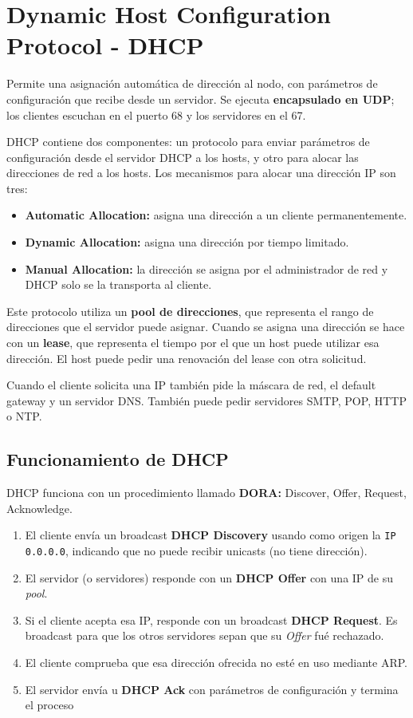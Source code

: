 \section{Dynamic Host Configuration Protocol - DHCP}

Permite una asignación automática de dirección al nodo, con parámetros de configuración que recibe desde un servidor. Se ejecuta \textbf{encapsulado en UDP}; los clientes escuchan en el puerto 68 y los servidores en el 67.

DHCP contiene dos componentes: un protocolo para enviar parámetros de configuración desde el servidor DHCP a los hosts, y otro para alocar las direcciones de red a los hosts. Los mecanismos para alocar una dirección IP son tres: 

\begin{itemize}[label=\textcolor{acento}{$\bullet$}]
    \item \textbf{Automatic Allocation:} asigna una dirección a un cliente permanentemente.
    \item \textbf{Dynamic Allocation:} asigna una dirección por tiempo limitado.
    \item \textbf{Manual Allocation:} la dirección se asigna por el administrador de red y DHCP solo se la transporta al cliente.
\end{itemize}

Este protocolo utiliza un \textbf{pool de direcciones}, que representa el rango de direcciones que el servidor puede asignar. Cuando se asigna una dirección se hace con un \textbf{lease}, que representa el tiempo por el que un host puede utilizar esa dirección. El host puede pedir una renovación del lease con otra solicitud. 

Cuando el cliente solicita una IP también pide la máscara de red, el default gateway y un servidor DNS. También puede pedir servidores SMTP, POP, HTTP o NTP.

\subsection{Funcionamiento de DHCP}

DHCP funciona con un procedimiento llamado \textbf{DORA:} Discover, Offer, Request, Acknowledge.

\begin{enumerate}[label=\textcolor{acento}{\textbf{\arabic*.}}]
    \item El cliente envía un broadcast \textbf{DHCP Discovery} usando como origen la \texttt{IP 0.0.0.0}, indicando que no puede recibir unicasts (no tiene dirección).
    \item El servidor (o servidores) responde con un \textbf{DHCP Offer} con una IP de su \emph{pool}.
    \item Si el cliente acepta esa IP, responde con un broadcast \textbf{DHCP Request}. Es broadcast para que los otros servidores sepan que su \emph{Offer} fué rechazado.
    \item El cliente comprueba que esa dirección ofrecida no esté en uso mediante ARP.
    \item El servidor envía u \textbf{DHCP Ack} con parámetros de configuración y termina el proceso
\end{enumerate}

